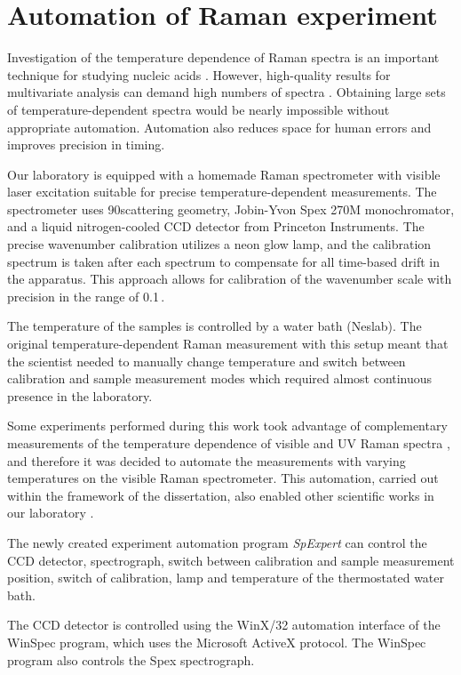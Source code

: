 \section{Automation of Raman experiment}

Investigation of the temperature dependence of Raman spectra is an important
technique for studying nucleic acids
\parencite{Klener2021}.
However, high-quality results for multivariate analysis can demand high numbers
of spectra
\parencite{Palacky2020}.
Obtaining large sets of temperature-dependent spectra would be nearly
impossible without appropriate automation.
Automation also reduces space for human errors and improves precision in
timing.

Our laboratory is equipped with a homemade Raman spectrometer with visible
laser excitation suitable for precise temperature-dependent measurements.
The spectrometer uses 90\textdegree scattering geometry, Jobin-Yvon Spex 270M
monochromator, and a liquid nitrogen-cooled CCD detector from Princeton
Instruments.
The precise wavenumber calibration utilizes a neon glow lamp, and the
calibration spectrum is taken after each spectrum to compensate for all
time-based drift in the apparatus.
This approach allows for calibration of the wavenumber scale with precision in
the range of 0.1\,\icm{}.

The temperature of the samples is controlled by a water bath (Neslab).
The original
temperature-dependent Raman measurement with this setup meant that the
scientist needed to manually change temperature and switch between calibration
and sample measurement modes which required almost continuous presence
in the laboratory.

Some experiments performed during this work took advantage of complementary
measurements of the temperature dependence of visible and UV Raman spectra
\parencite{Klener2021},
and therefore it was decided to automate the measurements with varying
temperatures on the visible Raman spectrometer.
This automation, carried out within the framework of the dissertation, also
enabled other scientific works in our laboratory
\parencite{%
	Mudronova2016,%
	Bravo2018,%
	Palacky2020%
}.

The newly created experiment automation program \emph{SpExpert} can control the
CCD detector, spectrograph, switch between calibration and sample measurement
position, switch of calibration, lamp and temperature of the thermostated
water bath.

The CCD detector is controlled using the WinX/32 automation interface of the
WinSpec program, which uses the Microsoft ActiveX protocol. The WinSpec program
also controls the Spex spectrograph.


